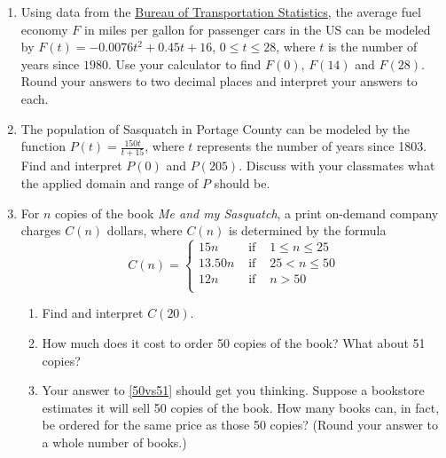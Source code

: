 \begin{enumerate}
\item Using data from the  \href{http://www.bts.gov/publications/national_transportation_statistics/html/table_04_23.html}{\underline{Bureau of Transportation Statistics}}, the average fuel economy $F$ in miles per gallon for passenger cars in the US can be modeled by  $F(t) = -0.0076t^2+0.45t + 16$, $0 \leq t \leq 28$, where $t$ is the number of years since $1980$. Use your calculator to find $F(0)$, $F(14)$ and $F(28)$.  Round your answers to two decimal places and interpret your answers to each.


\item The population of Sasquatch in Portage County can be modeled by the function $P(t) = \frac{150t}{t + 15}$, where $t$ represents the number of  years since 1803.  Find and interpret $P(0)$ and $P(205)$.  Discuss with your classmates what the applied domain and range of $P$ should be.

\label{Sasquatchfunc1}

\item \label{piecewiseordering} For $n$ copies of the book \textit{Me and my Sasquatch}, a print on-demand company charges $C(n)$ dollars, where $C(n)$ is determined by the formula \[{\displaystyle C(n) = \left\{ \begin{array}{rcl}  15n & \mbox{ if } & 1 \leq n \leq 25  \\
                                                            13.50n  & \mbox{ if } & 25 < n \leq 50 \\
                                                            12n & \mbox{ if } & n > 50 \\
                                     \end{array} \right. }\]
                                     
                                     
\begin{enumerate}

\item  Find and interpret $C(20)$.  %

\item  \label{50vs51} How much does it cost to order 50 copies of the book?  What about 51 copies? %

\item  Your answer to \ref{50vs51} should get you thinking. Suppose a bookstore estimates it will sell 50 copies of the book.  How many books can, in fact, be ordered for the same price as those 50 copies? (Round your answer to a  whole number of books.)  %


\end{enumerate}
\end{enumerate}
